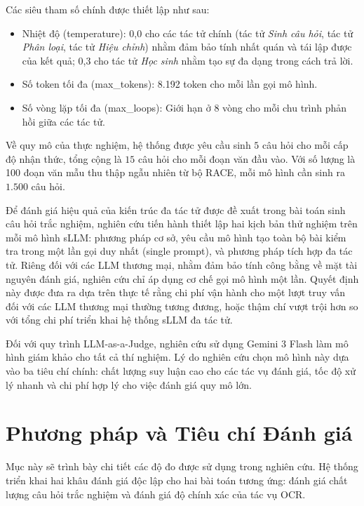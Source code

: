 Các siêu tham số chính được thiết lập như sau:
\begin{itemize}
    \item Nhiệt độ (temperature): 0,0 cho các tác tử chính (tác tử \textit{Sinh câu hỏi}, tác tử \textit{Phân loại}, tác tử \textit{Hiệu chỉnh}) nhằm đảm bảo tính nhất quán và tái lập được của kết quả; 0,3 cho tác tử \textit{Học sinh} nhằm tạo sự đa dạng trong cách trả lời.
    \item Số token tối đa (max\_tokens): 8.192 token cho mỗi lần gọi mô hình.
    \item Số vòng lặp tối đa (max\_loops): Giới hạn ở 8 vòng cho mỗi chu trình phản hồi giữa các tác tử.
\end{itemize}

Về quy mô của thực nghiệm, hệ thống được yêu cầu sinh $5$ câu hỏi cho mỗi cấp độ nhận thức, tổng cộng là $15$ câu hỏi cho mỗi đoạn văn đầu vào. Với số lượng là 100 đoạn văn mẫu thu thập ngẫu nhiên từ bộ RACE, mỗi mô hình cần sinh ra $1.500$ câu hỏi.

Để đánh giá hiệu quả của kiến trúc đa tác tử được đề xuất trong bài toán sinh câu hỏi trắc nghiệm, nghiên cứu tiến hành thiết lập hai kịch bản thử nghiệm trên mỗi mô hình sLLM: phương pháp cơ sở, yêu cầu mô hình tạo toàn bộ bài kiểm tra trong một lần gọi duy nhất (single prompt), và phương pháp tích hợp đa tác tử. Riêng đối với các LLM thương mại, nhằm đảm bảo tính công bằng về mặt tài nguyên đánh giá, nghiên cứu chỉ áp dụng cơ chế gọi mô hình một lần. Quyết định này được đưa ra dựa trên thực tế rằng chi phí vận hành cho một lượt truy vấn đối với các LLM thương mại thường tương đương, hoặc thậm chí vượt trội hơn so với tổng chi phí triển khai hệ thống sLLM đa tác tử. 

Đối với quy trình LLM-as-a-Judge, nghiên cứu sử dụng Gemini 3 Flash làm mô hình giám khảo cho tất cả thí nghiệm. Lý do nghiên cứu chọn mô hình này dựa vào ba tiêu chí chính: chất lượng suy luận cao cho các tác vụ đánh giá, tốc độ xử lý nhanh và chi phí hợp lý cho việc đánh giá quy mô lớn.

\section{Phương pháp và Tiêu chí Đánh giá}

Mục này sẽ trình bày chi tiết các độ đo được sử dụng trong nghiên cứu. Hệ thống triển khai hai khâu đánh giá độc lập cho hai bài toán tương ứng: đánh giá chất lượng câu hỏi trắc nghiệm và đánh giá độ chính xác của tác vụ OCR.

